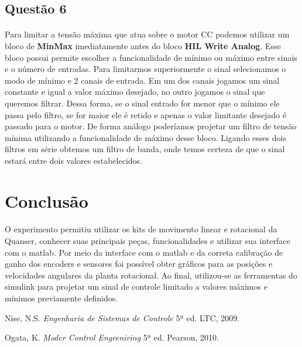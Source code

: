 \documentclass[a4paper,11pt]{article}
\begin{document}
\subsection{Questão 6}
\paragraph{}Para limitar a tensão máxima que atua sobre o motor CC podemos utilizar um bloco de \textbf{MinMax}
imediatamente antes do bloco \textbf{ HIL Write Analog}. Esse bloco possui permite escolher a funcionalidade
de mínimo ou máximo entre sinais e o número de entradas. Para limitarmos superiormente o sinal selecionamos
o modo de mínimo e 2 canais de entrada. Em um dos canais jogamos um sinal constante e igual a valor máximo 
desejado, no outro jogamos o sinal que queremos filtrar. Dessa forma, se o sinal entrado for menor que 
o mínimo ele passa pelo filtro, se for maior ele é retido e apenas o valor limitante desejado é passado para o
motor. De forma análogo poderíamos projetar um filtro de tensão mínima utilizando a funcionalidade de máximo
desse bloco. Ligando esses dois filtros em série obtemos um filtro de banda, onde temos certeza de que o sinal
estará entre dois valores estabelecidos.

\newpage
\section{Conclusão}

\paragraph{} O experimento permitiu utilizar os kits de movimento linear e rotacional da Quanser,
conhecer suas principais peças, funcionalidades e utilizar sua interface com o matlab. Por meio da interface
com o matlab e da correta calibração de ganho dos encoders e sensores
foi possível obter gráficos para as posições e velocidades angulares da planta rotacional.
Ao final, utilizou-se as ferramentas do simulink para projetar um sinal de controle limitado a valores máximos
e mínimos previamente definidos.

\begin{thebibliography}{9}    
  		Nise, N.S.
  		\emph{Engenharia de Sistemas de Controle}
 		 5ª ed.
		LTC, 2009.

  		Ogata, K.
  		\emph{Moder Control Engeeniring}
 		 5ª ed.
		Pearson, 2010.
	 
\end{thebibliography}
\end{document}
